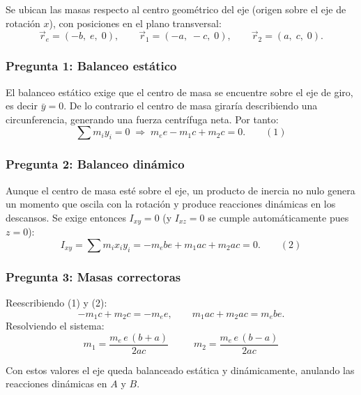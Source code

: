 \begin{sol}

Se ubican las masas respecto al centro geométrico del eje (origen sobre el eje de rotación
$x$), con posiciones en el plano transversal:
$$\vec{r}_e=(-b,\;e,\;0),\qquad \vec{r}_1=(-a,\;-c,\;0),\qquad \vec{r}_2=(a,\;c,\;0).$$

\subsubsection*{Pregunta 1: Balanceo estático}

El balanceo estático exige que el centro de masa se encuentre sobre el eje de giro, es decir
$\bar{y}=0$. De lo contrario el centro de masa giraría describiendo una circunferencia,
generando una fuerza centrífuga neta. Por tanto:
$$\sum m_i y_i = 0 \;\Longrightarrow\; m_e e - m_1 c + m_2 c = 0. \qquad (1)$$

\subsubsection*{Pregunta 2: Balanceo dinámico}

Aunque el centro de masa esté sobre el eje, un producto de inercia no nulo genera un momento
que oscila con la rotación y produce reacciones dinámicas en los descansos. Se exige entonces
$I_{xy}=0$ (y $I_{xz}=0$ se cumple automáticamente pues $z=0$):
$$I_{xy} = \sum m_i x_i y_i = -m_e b e + m_1 a c + m_2 a c = 0. \qquad (2)$$

\subsubsection*{Pregunta 3: Masas correctoras}

Reescribiendo (1) y (2):
$$-m_1 c + m_2 c = -m_e e,\qquad m_1 a c + m_2 a c = m_e b e.$$
Resolviendo el sistema:
$$\boxed{\;m_1 = \frac{m_e\,e\,(b+a)}{2ac}\;}\qquad
\boxed{\;m_2 = \frac{m_e\,e\,(b-a)}{2ac}\;}$$

Con estos valores el eje queda balanceado estática y dinámicamente, anulando las reacciones
dinámicas en $A$ y $B$.

\end{sol}
